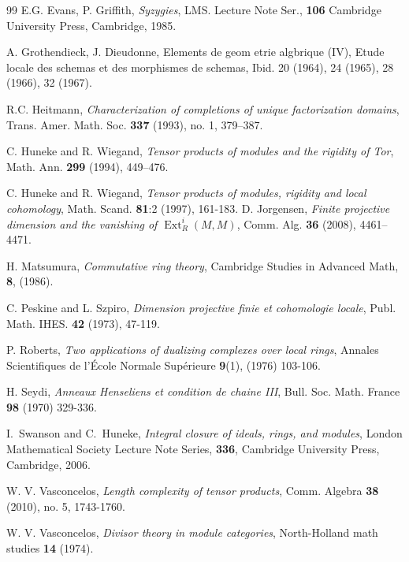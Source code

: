 \documentclass[11.05pt,a4paper]{amsart}
\theoremstyle{definition}
\theoremstyle{remark}
\newcommand{\Ext}{\operatorname{Ext}}
\begin{document}
\begin{thebibliography}{99}
 E.G.
Evans,   P. Griffith,   \emph{Syzygies},
LMS. Lecture Note Ser., \textbf{106}
Cambridge University Press, Cambridge, 1985.

 A. Grothendieck,   J. Dieudonne, Elements de geom etrie algbrique (IV), Etude locale des schemas et des morphismes de schemas, Ibid. 20 (1964),
 24 (1965), 28 (1966), 32 (1967).
 
 R.C. Heitmann, {\it Characterization of completions of unique factorization
 	domains}, Trans. Amer. Math. Soc. {\bf337} (1993), no. 1, 379–387.
 
C. Huneke and R. Wiegand, \emph{Tensor products of modules and the rigidity of Tor}, Math. Ann. {\bf{299}} (1994), 449--476.

C. Huneke and R. Wiegand, \emph{Tensor products of modules, rigidity and
	local cohomology}, Math. Scand.  {\bf81}:2 (1997), 161-183.
D. Jorgensen, \emph{Finite projective dimension and the vanishing of $\Ext^i_R(M,M)$}, Comm. Alg.  {\bf36} (2008), 4461--4471.

 H. Matsumura, \emph{Commutative ring theory}, Cambridge Studies in Advanced Math, \textbf{8}, (1986).
 
 C. Peskine and L. Szpiro, \emph{Dimension projective finie et cohomologie locale},
 Publ. Math. IHES. 
  {\bf42} 
 (1973),  47-119.
 
 P. Roberts, \emph{
 	Two applications of dualizing complexes over local rings}, Annales Scientifiques de l'École Normale Supérieure
 {\bf{9}}(1), (1976) 103-106.
 
   {H. Seydi}, \emph{Anneaux Henseliens et condition de chaine III},
 Bull. Soc. Math. France 
   {\bf{98}}   (1970) 329-336.
   
  {I.~Swanson} and {C.~Huneke}, \emph{Integral closure of ideals, rings, and
 	modules}, London Mathematical Society Lecture Note Series, {\bf
 	336}, Cambridge University Press, Cambridge, 2006.
 
 
 
 
 W. V. Vasconcelos, \emph{Length complexity of tensor products},
 Comm. Algebra {\bf{38}} (2010), no. 5, 1743-1760.
 
  W. V. Vasconcelos, \emph{Divisor theory in module categories}, 
North-Holland math studies  {\bf{14}} (1974).
\end{thebibliography}
\end{document}
